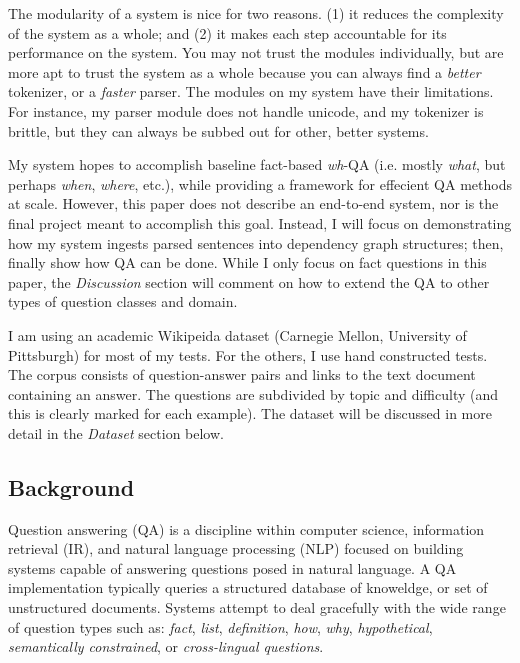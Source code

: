 \documentclass[twoside]{article}
\begin{document}
The modularity of a system is nice for two reasons.  (1) it reduces the complexity of the system as a whole; and (2) it makes each step accountable for its performance on the system.  You may not trust the modules individually, but are more apt to trust the system as a whole because you can always find a \textit{better} tokenizer, or a \textit{faster} parser.  The modules on my system have their limitations.  For instance, my parser module does not handle unicode, and my tokenizer is brittle, but they can always be subbed out for other, better systems.

My system hopes to accomplish baseline fact-based \textit{wh}-QA (i.e. mostly \textit{what}, but perhaps \textit{when}, \textit{where}, etc.), while providing a framework for effecient QA methods at scale. However, this paper does not describe an end-to-end system, nor is the final project meant to accomplish this goal.  Instead, I will focus on demonstrating how my system ingests parsed sentences into dependency graph structures; then, finally show how QA can be done.  While I only focus on fact questions in this paper, the \textit{Discussion} section will comment on how to extend the QA to other types of question classes and domain.

I am using an academic Wikipeida dataset (Carnegie Mellon, University of Pittsburgh) for most of my tests.  For the others, I use hand constructed tests.  The corpus consists of question-answer pairs and links to the text document containing an answer.  The questions are subdivided by topic and difficulty (and this is clearly marked for each example). The dataset will be discussed in more detail in the \textit{Dataset} section below.

\subsection{Background}

Question answering (QA) is a discipline within computer science, information retrieval (IR), and natural language processing (NLP) focused on building systems capable of answering questions posed in natural language. A QA implementation typically queries a structured database of knoweldge, or set of unstructured documents.  Systems attempt to deal gracefully with the wide range of question types such as: \textit{fact}, \textit{list}, \textit{definition}, \textit{how}, \textit{why}, \textit{hypothetical}, \textit{semantically constrained}, or \textit{cross-lingual questions}.
\end{document}
